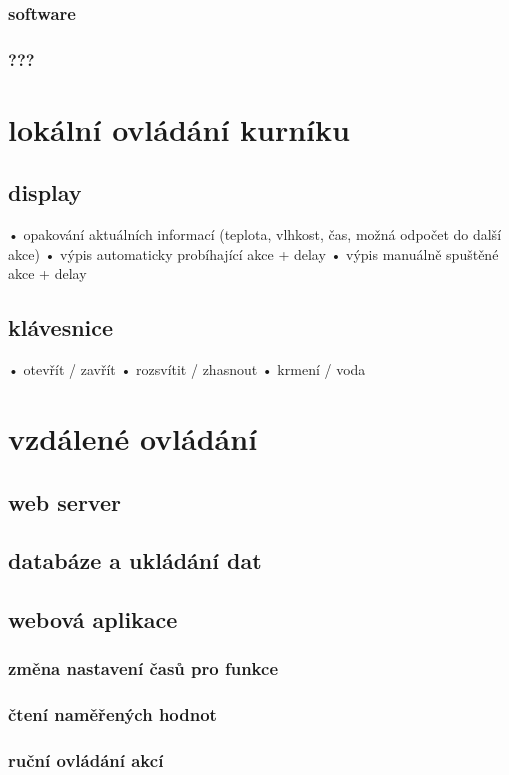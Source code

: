 \documentclass[
program=itp,
  biblatex,
  figures=false,
  glossaries,
  index
]{kidiplom}
\begin{document}
\subsubsection{software}
\subsubsection{???}


\section{lokální ovládání kurníku}
\subsection{display}
•	opakování aktuálních informací (teplota, vlhkost, čas, možná odpočet do další akce)
•	výpis automaticky probíhající akce + delay
•	výpis manuálně spuštěné akce + delay

\subsection{klávesnice}
•	otevřít / zavřít
•	rozsvítit / zhasnout
•	krmení / voda
\section{vzdálené ovládání }
\subsection{web server}


\subsection{databáze a ukládání dat}
\subsection{webová aplikace}
\subsubsection{změna nastavení časů pro funkce}
\subsubsection{čtení naměřených hodnot}
\subsubsection{ruční ovládání akcí}
\end{document}
